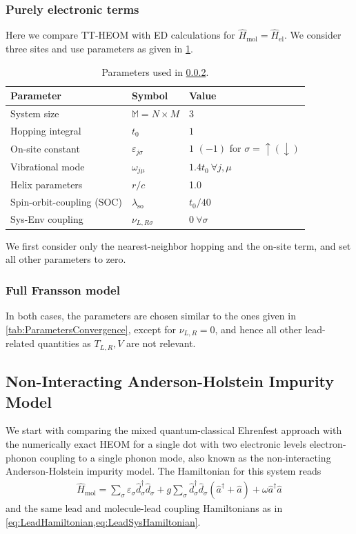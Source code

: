\documentclass{article}
\newcommand{\pdagger}{{\phantom{\dagger}}}
\begin{document}
\subsubsection{Purely electronic terms}
Here we compare TT-HEOM with ED calculations for $\hat{H}_\mathrm{mol} = \hat{H}_\mathrm{el}$. We consider three sites and use parameters as given in \cref{tab:Parameters_Res1}.
\begin{table}
	\centering
	\caption{Parameters used in \cref{sec:Res_ElectronicOnly}.}
\begin{tabular}{lll}
	\toprule
	Parameter & Symbol & Value\\\midrule
	System size &$\mathbb{M}=N\times M$& $3$  \\
	Hopping integral &$t_0$&$1$ \\ 
	On-site constant &$\varepsilon_{j\sigma}$& $1$ $(-1)$ for $\sigma =\uparrow(\downarrow)$  \\
	Vibrational mode &$\omega_{j\mu}$&$1.4t_0 \  \forall j,\mu$  \\
	Helix parameters &$r/c$& 1.0  \\
	Spin-orbit-coupling (SOC) &$\lambda_\mathrm{so}$& $t_0/40$  \\
	Sys-Env coupling &$\nu_{L,R\sigma}$ & $0 \ \forall \sigma$\\
	\bottomrule
\end{tabular}\label{tab:Parameters_Res1}
\end{table}
We first consider only the nearest-neighbor hopping and the on-site term, and set all other parameters to zero. 
\subsubsection{Full Fransson model}\label{sec:Res_ElectronicOnly}
In both cases, the parameters are chosen similar to the ones given in \cref{tab:ParametersConvergence}, except for $\nu_{L,R} = 0$, and hence all other lead-related quantities as $T_{L,R},V$ are not relevant. 

\subsection{Non-Interacting Anderson-Holstein Impurity Model}
We start with comparing the mixed quantum-classical Ehrenfest approach with the numerically exact HEOM for a single dot with two electronic levels electron-phonon coupling to a single phonon mode, also known as the non-interacting Anderson-Holstein impurity model. The Hamiltonian for this system reads
\begin{align}
	\hat{H}_\mathrm{mol} = \sum_\sigma \varepsilon_\sigma^\pdagger \hat{d}_\sigma^\dagger \hat{d}_\sigma^\pdagger + g \sum_\sigma \hat{d}^\dagger_\sigma \hat{d}^\pdagger_\sigma (\hat{a}^\dagger + \hat{a}) + \omega \hat{a}^\dagger \hat{a} 
\end{align}
and the same lead and molecule-lead coupling Hamiltonians as in \cref{eq:LeadHamiltonian,eq:LeadSysHamiltonian}. 

\printbibliography
\end{document}
